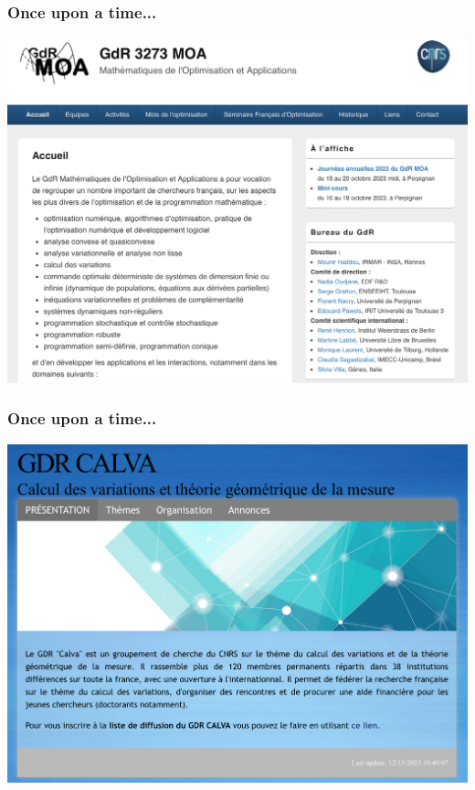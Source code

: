 \documentclass[9pt]{beamer}
\begin{document}
\begin{frame}
\frametitle{\bf Once upon a time...}
\centering \includegraphics[width=.99\textwidth]{moa}
\end{frame}

\begin{frame}
\frametitle{\bf Once upon a time...}
\centering \includegraphics[width=.99\textwidth]{calva}
\end{frame}
\end{document}
